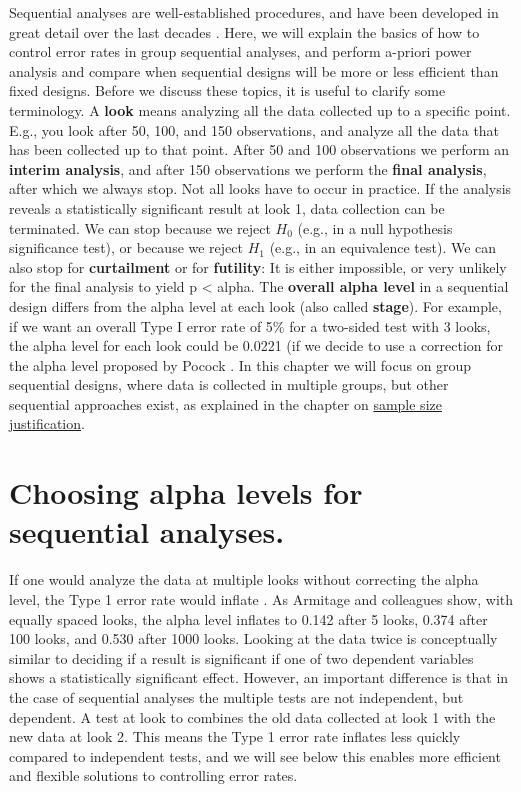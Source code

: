 \documentclass[
  oneside]{book}
\begin{document}
Sequential analyses are well-established procedures, and have been developed in great detail over the last decades \citep{proschan_statistical_2006, jennison_group_2000, wassmer_group_2016}. Here, we will explain the basics of how to control error rates in group sequential analyses, and perform a-priori power analysis and compare when sequential designs will be more or less efficient than fixed designs. Before we discuss these topics, it is useful to clarify some terminology. A \textbf{look} means analyzing all the data collected up to a specific point. E.g., you look after 50, 100, and 150 observations, and analyze all the data that has been collected up to that point. After 50 and 100 observations we perform an \textbf{interim analysis}, and after 150 observations we perform the \textbf{final analysis}, after which we always stop. Not all looks have to occur in practice. If the analysis reveals a statistically significant result at look 1, data collection can be terminated. We can stop because we reject \(H_0\) (e.g., in a null hypothesis significance test), or because we reject \(H_1\) (e.g., in an equivalence test). We can also stop for \textbf{curtailment} or for \textbf{futility}: It is either impossible, or very unlikely for the final analysis to yield p \textless{} alpha. The \textbf{overall alpha level} in a sequential design differs from the alpha level at each look (also called \textbf{stage}). For example, if we want an overall Type I error rate of 5\% for a two-sided test with 3 looks, the alpha level for each look could be 0.0221 (if we decide to use a correction for the alpha level proposed by Pocock \citep{pocock_group_1977}. In this chapter we will focus on group sequential designs, where data is collected in multiple groups, but other sequential approaches exist, as explained in the chapter on \protect\hyperlink{sequentialsamplesize}{sample size justification}.

\hypertarget{choosing-alpha-levels-for-sequential-analyses.}{%
\section{Choosing alpha levels for sequential analyses.}\label{choosing-alpha-levels-for-sequential-analyses.}}

If one would analyze the data at multiple looks without correcting the alpha level, the Type 1 error rate would inflate \citep{armitage_repeated_1969}. As Armitage and colleagues show, with equally spaced looks, the alpha level inflates to 0.142 after 5 looks, 0.374 after 100 looks, and 0.530 after 1000 looks. Looking at the data twice is conceptually similar to deciding if a result is significant if one of two dependent variables shows a statistically significant effect. However, an important difference is that in the case of sequential analyses the multiple tests are not independent, but dependent. A test at look to combines the old data collected at look 1 with the new data at look 2. This means the Type 1 error rate inflates less quickly compared to independent tests, and we will see below this enables more efficient and flexible solutions to controlling error rates.
\end{document}
